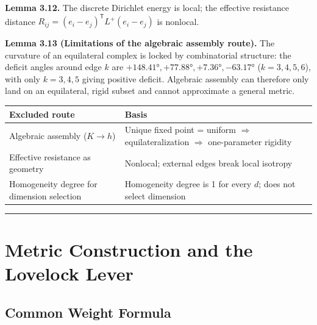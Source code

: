 \documentclass[
  11pt,
]{article}
\newcounter{none} %
\begin{document}
\textbf{Lemma 3.12.} The discrete Dirichlet energy is local; the
effective resistance distance
\(R_{ij}=(e_i-e_j)^{\mathsf T}L^+(e_i-e_j)\) is nonlocal.

\textbf{Lemma 3.13 (Limitations of the algebraic assembly route).} The
curvature of an equilateral complex is locked by combinatorial
structure: the deficit angles around edge \(k\) are
\(+148.41°,+77.88°,+7.36°,-63.17°\) (\(k=3,4,5,6\)), with only
\(k=3,4,5\) giving positive deficit. Algebraic assembly can therefore
only land on an equilateral, rigid subset and cannot approximate a
general metric.

{\def\LTcaptype{none} %
\begin{longtable}[]{@{}
  >{\raggedright\arraybackslash}p{}
  >{\raggedright\arraybackslash}p{}@{}}
\toprule\noalign{}
\begin{minipage}[b]{\linewidth}\raggedright
Excluded route
\end{minipage} & \begin{minipage}[b]{\linewidth}\raggedright
Basis
\end{minipage} \\
\midrule\noalign{}
\endhead
\bottomrule\noalign{}
\endlastfoot
Algebraic assembly (\(K\to h\)) & Unique fixed point = uniform
\(\Rightarrow\) equilateralization \(\Rightarrow\) one-parameter
rigidity \\
Effective resistance as geometry & Nonlocal; external edges break local
isotropy \\
Homogeneity degree for dimension selection & Homogeneity degree is 1 for
every \(d\); does not select dimension \\
\end{longtable}
}

\begin{center}\rule{0.5\linewidth}{0.5pt}\end{center}

\section{Metric Construction and the Lovelock
Lever}\label{metric-construction-and-the-lovelock-lever}

\subsection{Common Weight Formula}\label{common-weight-formula}
\end{document}
